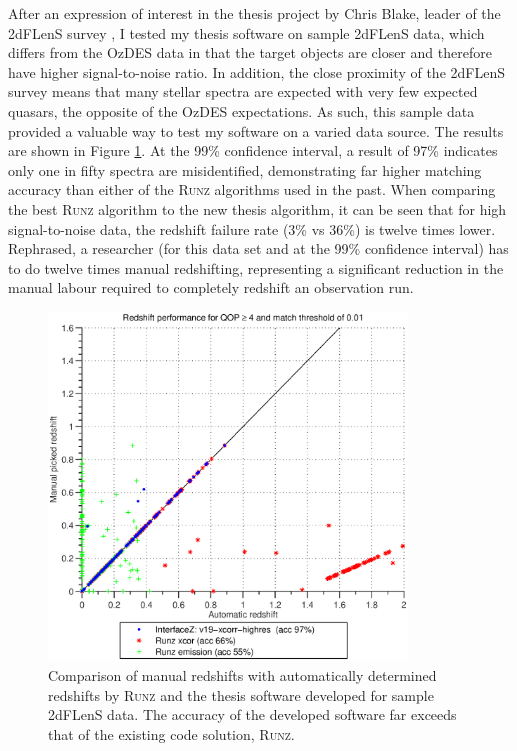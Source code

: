 \documentclass[titlesmallcaps, examinerscopy, copyrightpage]{uqthesis}
\newcommand{\runz}{\textsc{Runz}}
\begin{document}
After an expression of interest in the thesis project by Chris Blake, leader of the 2dFLenS survey \cite{2dFLenS}, I tested my thesis software on sample 2dFLenS data, which differs from the OzDES data in that the target objects are closer and therefore have higher signal-to-noise ratio. In addition, the close proximity of the 2dFLenS survey means that many stellar spectra are expected with very few expected quasars, the opposite of the OzDES expectations. As such, this sample data provided a valuable way to test my software on a varied data source. The results are shown in Figure \ref{fig:2dF}. At the 99\% confidence interval, a result of 97\% indicates only one in fifty spectra are misidentified, demonstrating far higher matching accuracy than either of the \runz{} algorithms used in the past. When comparing the best \runz{} algorithm to the new thesis algorithm, it can be seen that for high signal-to-noise data, the redshift failure rate (3\% vs 36\%) is twelve times lower. Rephrased, a researcher (for this data set and at the 99\% confidence interval) has to do twelve times manual redshifting, representing a significant reduction in the manual labour required to completely redshift an observation run.

\begin{figure}[ht!]
\includegraphics[width=0.85\textwidth]{images/2df.eps} 
\centering
\caption{Comparison of manual redshifts with automatically determined redshifts by \runz{} and the thesis software developed for sample 2dFLenS data. The accuracy of the developed software far exceeds that of the existing code solution, \runz{}.}
\label{fig:2dF}
\end{figure}
\end{document}
